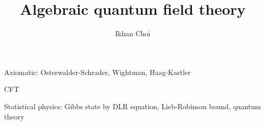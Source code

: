 \documentclass{../../large}
\begin{document}
\title{Algebraic quantum field theory}
\author{Ikhan Choi}
\maketitle
\tableofcontents



\chapter{}

Axiomatic: Osterwalder-Schrader, Wightman, Haag-Kastler

CFT

Statistical physics: Gibbs state by DLR equation, Lieb-Robinson bound, quantum theory
\end{document}
